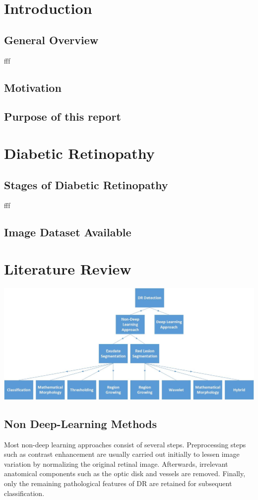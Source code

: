 \documentclass[12pt]{report}
\begin{document}
\normalsize
\tableofcontents
\setlength{\parskip}{1em}

\chapter{Introduction}
\section{General Overview}
fff
\cite{kauppi2006diaretdb0}
\cite{kalviainen2007diaretdb1}
\cite{decenciere_feedback_2014}
\cite{kaggle_data}
\newpage
\section{Motivation}
\section{Purpose of this report}
\chapter{Diabetic Retinopathy}
\section{Stages of Diabetic Retinopathy}
fff
\newpage
\section{Image Dataset Available}


\chapter{Literature Review}
\includegraphics[width=1\textwidth]{Drawing1}

\section{Non Deep-Learning Methods}
Most non-deep learning approaches consist of several steps. Preprocessing steps such as contrast enhancement are usually carried out initially to lessen image variation by normalizing the original retinal image. Afterwards, irrelevant anatomical components such as the optic disk and vessels are removed. Finally, only the remaining pathological features of DR are retained for subsequent classification.
\end{document}
